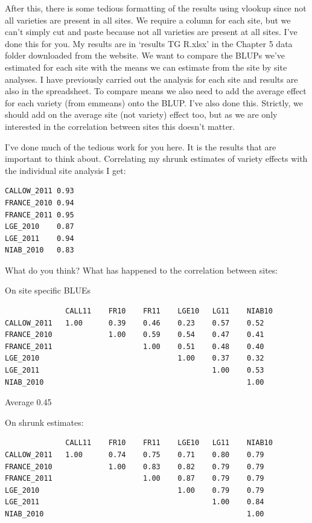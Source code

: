 \documentclass[
]{book}
\begin{document}
After this, there is some tedious formatting of the results using vlookup since not all varieties are present in all sites. We require a column for each site, but we can't simply cut and paste because not all varieties are present at all sites. I've done this for you. My results are in `results TG R.xlsx' in the Chapter 5 data folder downloaded from the website. We want to compare the BLUPs we've estimated for each site with the means we can estimate from the site by site analyses. I have previously carried out the analysis for each site and results are also in the spreadsheet. To compare means we also need to add the average effect for each variety (from emmeans) onto the BLUP. I've also done this. Strictly, we should add on the average site (not variety) effect too, but as we are only interested in the correlation between sites this doesn't matter.

I've done much of the tedious work for you here. It is the results that are important to think about. Correlating my shrunk estimates of variety effects with the individual site analysis I get:

\begin{verbatim}
CALLOW_2011 0.93
FRANCE_2010 0.94
FRANCE_2011 0.95
LGE_2010    0.87
LGE_2011    0.94
NIAB_2010   0.83
\end{verbatim}

What do you think? What has happened to the correlation between sites:

On site specific BLUEs

\begin{verbatim}
              CALL11    FR10    FR11    LGE10   LG11    NIAB10
CALLOW_2011   1.00      0.39    0.46    0.23    0.57    0.52
FRANCE_2010             1.00    0.59    0.54    0.47    0.41
FRANCE_2011                     1.00    0.51    0.48    0.40
LGE_2010                                1.00    0.37    0.32
LGE_2011                                        1.00    0.53
NIAB_2010                                               1.00
\end{verbatim}

Average 0.45

On shrunk estimates:

\begin{verbatim}
              CALL11    FR10    FR11    LGE10   LG11    NIAB10
CALLOW_2011   1.00      0.74    0.75    0.71    0.80    0.79
FRANCE_2010             1.00    0.83    0.82    0.79    0.79
FRANCE_2011                     1.00    0.87    0.79    0.79
LGE_2010                                1.00    0.79    0.79
LGE_2011                                        1.00    0.84
NIAB_2010                                               1.00
\end{verbatim}
\end{document}
